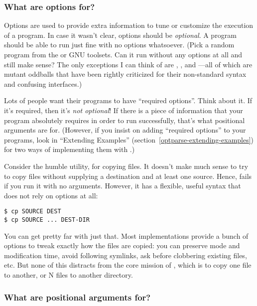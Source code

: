 \subsubsection{What are options for?\label{optparse-options}}

Options are used to provide extra information to tune or customize the
execution of a program.  In case it wasn't clear, options should be
\emph{optional}.  A program should be able to run just fine with no
options whatsoever.  (Pick a random program from the \UNIX{} or GNU
toolsets.  Can it run without any options at all and still make sense?
The only exceptions I can think of are , ,
and ---all of which are mutant oddballs that have been
rightly criticized for their non-standard syntax and confusing
interfaces.)

Lots of people want their programs to have ``required options''.
Think about it.  If it's required, then it's \emph{not optional}!  If
there is a piece of information that your program absolutely requires
in order to run successfully, that's what positional arguments are
for.  (However, if you insist on adding ``required options'' to your
programs, look in ``Extending Examples''
(section~\ref{optparse-extending-examples}) for two ways of
implementing them with .)

Consider the humble  utility, for copying files.  It
doesn't make much sense to try to copy files without supplying a
destination and at least one source.  Hence,  fails if you
run it with no arguments.  However, it has a flexible, useful syntax
that does not rely on options at all:

\begin{verbatim}
$ cp SOURCE DEST
$ cp SOURCE ... DEST-DIR
\end{verbatim}

You can get pretty far with just that.  Most 
implementations provide a bunch of options to tweak exactly how the
files are copied: you can preserve mode and modification time, avoid
following symlinks, ask before clobbering existing files, etc.  But
none of this distracts from the core mission of , which is
to copy one file to another, or N files to another directory.

\subsubsection{What are positional arguments for? \label{optparse-positional-arguments}}

